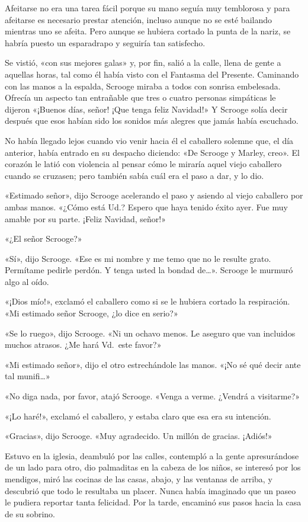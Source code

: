 \documentclass{novela}
\begin{document}
 Afeitarse no era una tarea fácil porque su mano seguía muy temblorosa y para afeitarse es necesario prestar atención, incluso aunque no se esté bailando mientras uno se afeita. Pero aunque se hubiera cortado la punta de la nariz, se habría puesto un esparadrapo y seguiría tan satisfecho.

 Se vistió, «con sus mejores galas» y, por fin, salió a la calle, llena de gente a aquellas horas, tal como él había visto con el Fantasma del Presente. Caminando con las manos a la espalda, Scrooge miraba a todos con sonrisa embelesada. Ofrecía un aspecto tan entrañable que tres o cuatro personas simpáticas le dijeron «¡Buenos días, señor! ¡Que tenga feliz Navidad!» Y Scrooge solía decir después que esos habían sido los sonidos más alegres que jamás había escuchado.

 No había llegado lejos cuando vio venir hacia él el caballero solemne que, el día anterior, había entrado en su despacho diciendo: «De Scrooge y Marley, creo». El corazón le latió con violencia al pensar cómo le miraría aquel viejo caballero cuando se cruzasen; pero también sabía cuál era el paso a dar, y lo dio.



 «Estimado señor», dijo Scrooge acelerando el paso y asiendo al viejo caballero por ambas manos. «¿Cómo está Ud.? Espero que haya tenido éxito ayer. Fue muy amable por su parte. ¡Feliz Navidad, señor!»

 «¿El señor Scrooge?»

 «Sí», dijo Scrooge. «Ese es mi nombre y me temo que no le resulte grato. Permítame pedirle perdón. Y tenga usted la bondad de{\ldots}». Scrooge le murmuró algo al oído.

 «¡Dios mío!», exclamó el caballero como si se le hubiera cortado la respiración. «Mi estimado señor Scrooge, ¿lo dice en serio?»

 «Se lo ruego», dijo Scrooge. «Ni un ochavo menos. Le aseguro que van incluidos muchos atrasos. ¿Me hará Vd.\  este favor?»

 «Mi estimado señor», dijo el otro estrechándole las manos. «¡No sé qué decir ante tal munifi{\ldots}»

 «No diga nada, por favor, atajó Scrooge. «Venga a verme. ¿Vendrá a visitarme?»

 «¡Lo haré!», exclamó el caballero, y estaba claro que esa era su intención.

 «Gracias», dijo Scrooge. «Muy agradecido. Un millón de gracias. ¡Adiós!»

 Estuvo en la iglesia, deambuló por las calles, contempló a la gente apresurándose de un lado para otro, dio palmaditas en la cabeza de los niños, se interesó por los mendigos, miró las cocinas de las casas, abajo, y las ventanas de arriba, y descubrió que todo le resultaba un placer. Nunca había imaginado que un paseo le pudiera reportar tanta felicidad. Por la tarde, encaminó sus pasos hacia la casa de su sobrino.
\end{document}

